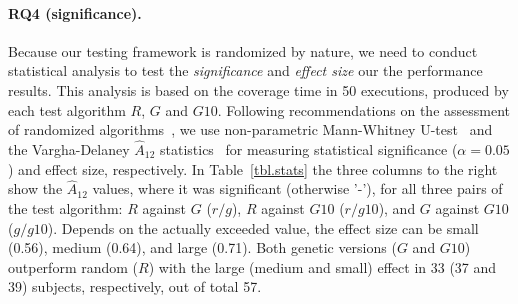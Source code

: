 \documentclass[sigconf]{acmart}
\begin{document}
\paragraph{\textbf{RQ4 (significance).}} Because our testing framework is randomized by nature, we need to conduct statistical analysis to test the \emph{significance} and \emph{effect size} our the performance results. This analysis is based on the coverage time in 50 executions, produced by each test algorithm $R$, $G$ and $G10$. Following recommendations on the assessment of randomized algorithms~\cite{arcuri2011practical}, we use non-parametric Mann-Whitney U-test~\cite{mann1947test} and the Vargha-Delaney $\hat{A}_{12}$ statistics~\cite{vargha2000critique} for measuring statistical significance ($\alpha=0.05$) and effect size, respectively. In Table~\ref{tbl.stats} the three columns to the right show the $\hat{A}_{12}$ values, where it was significant (otherwise '-'), for all three pairs of the test algorithm: $R$ against $G$ ($r/g$), $R$ against $G10$ ($r/g10$), and $G$ against $G10$ ($g/g10$). Depends on the actually exceeded value, the effect size can be small (0.56), medium (0.64), and large (0.71). Both genetic versions ($G$ and $G10$) outperform random ($R$) with the large (medium and small) effect in 33 (37 and 39) subjects, respectively, out of total 57. 
\end{document}
